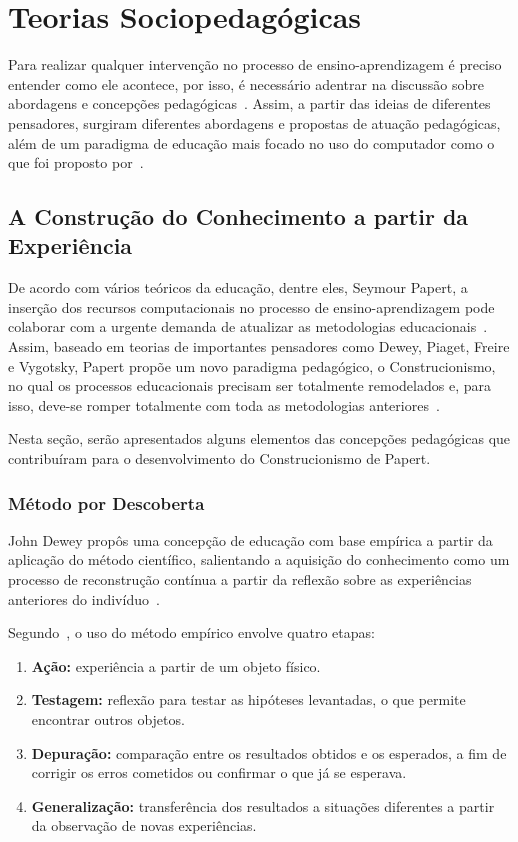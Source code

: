 \section{Teorias Sociopedagógicas}\label{section:sociopedagogicas}

Para realizar qualquer intervenção no processo de ensino-aprendizagem é preciso entender como ele acontece, por isso, é necessário adentrar na discussão sobre abordagens e concepções pedagógicas~\citep{bassedas:1996}. Assim, a partir das ideias de diferentes pensadores, %
surgiram diferentes abordagens e propostas de atuação pedagógicas, além de um paradigma de educação mais focado no uso do computador como o que foi proposto por~\cite{Papert:1994}.

\subsection{A Construção do Conhecimento a partir da Experiência}

De acordo com vários teóricos da educação, dentre eles, Seymour Papert, a inserção dos recursos computacionais no processo de ensino-aprendizagem pode colaborar com a urgente demanda de atualizar as metodologias educacionais~\citep{Almeida:2000}. Assim, baseado em teorias de importantes pensadores como Dewey, Piaget, Freire e Vygotsky, Papert propõe um novo paradigma pedagógico, o Construcionismo, no qual os processos educacionais precisam ser totalmente remodelados e, para isso, deve-se romper totalmente com toda as metodologias anteriores~\citep{Almeida:2000}.

Nesta seção, serão apresentados alguns elementos das concepções pedagógicas que contribuíram para o desenvolvimento do Construcionismo de Papert.

\subsubsection{Método por Descoberta}

John Dewey propôs uma concepção de educação com base empírica a partir da aplicação do método científico, salientando a aquisição do conhecimento como um processo de reconstrução contínua a partir da reflexão sobre as experiências anteriores do indivíduo~\citep{Dewey:1971}.

Segundo~\cite{Almeida:2000}, o uso do método empírico envolve quatro etapas:
\begin{enumerate}
	\item \textbf{Ação:} experiência a partir de um objeto físico. 
	\item \textbf{Testagem:} reflexão para testar as hipóteses levantadas, o que permite encontrar outros objetos.
	\item \textbf{Depuração:} comparação entre os resultados obtidos e os esperados, a fim de corrigir os erros cometidos ou confirmar o que já se esperava.
	\item \textbf{Generalização:} transferência dos resultados a situações diferentes a partir da observação de novas experiências.
\end{enumerate}

